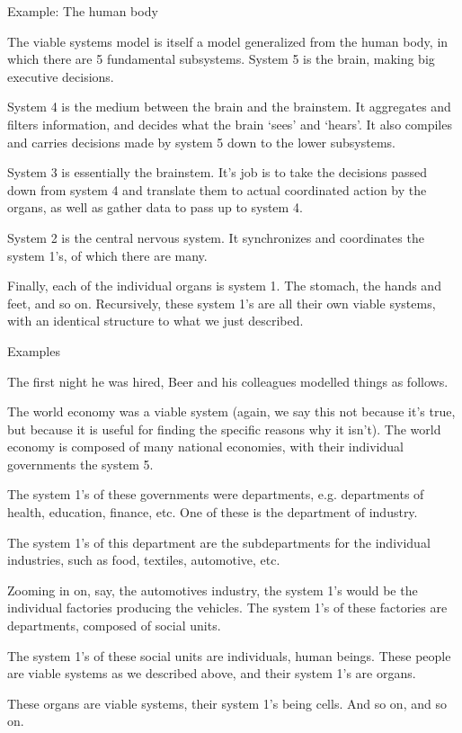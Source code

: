 \documentclass{beamer}
\begin{document}
\begin{frame}{Example: The human body}
    \begin{itemize}
        {\small \item The viable systems model is itself a model generalized from the human body, in which there are 5 fundamental subsystems. System 5 is the brain, making big executive decisions. 
        \item System 4 is the medium between the brain and the brainstem. It aggregates and filters information, and decides what the brain `sees' and `hears'. It also compiles and carries decisions made by system 5 down to the lower subsystems. 
        \item System 3 is essentially the brainstem. It's job is to take the decisions passed down from system 4 and translate them to actual coordinated action by the organs, as well as gather data to pass up to system 4. 
        \item System 2 is the central nervous system. It synchronizes and coordinates the system 1's, of which there are many. 
        \item Finally, each of the individual organs is system 1. The stomach, the hands and feet, and so on. Recursively, these system 1's are all their own viable systems, with an identical structure to what we just described.}
    \end{itemize}
\end{frame}

\begin{frame}{Examples}
    \begin{itemize}
        {\small \item The first night he was hired, Beer and his colleagues modelled things as follows.
        \item The world economy was a viable system (again, we say this not because it's true, but because it is useful for finding the specific reasons why it isn't). The world economy is composed of many national economies, with their individual governments the system 5. 
        \item The system 1's of these governments were departments, e.g. departments of health, education, finance, etc. One of these is the department of industry. 
        \item The system 1's of this department are the subdepartments for the individual industries, such as food, textiles, automotive, etc. 
        \item Zooming in on, say, the automotives industry, the system 1's would be the individual factories producing the vehicles. The system 1's of these factories are departments, composed of social units. 
        \item The system 1's of these social units are individuals, human beings. These people are viable systems as we described above, and their system 1's are organs. 
        \item These organs are viable systems, their system 1's being cells. And so on, and so on. }
    \end{itemize}
\end{frame}
\end{document}
